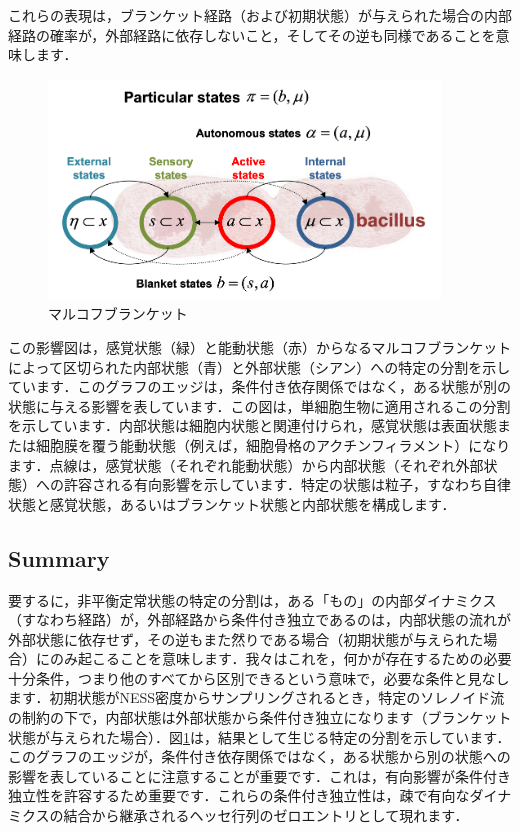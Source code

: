 \documentclass[a4paper, titlepage]{jsarticle}
\begin{document}
これらの表現は，ブランケット経路（および初期状態）が与えられた場合の内部経路の確率が，外部経路に依存しないこと，そしてその逆も同様であることを意味します．
\clearpage
\begin{figure}[htbp]
   \centering
   \includegraphics[scale=0.8]{Markov_blankets.png}
   \caption{マルコフブランケット}
   \label{markovblankets}
\end{figure}
{
    \footnotesize
    \noindent
    この影響図は，感覚状態（緑）と能動状態（赤）からなるマルコフブランケットによって区切られた内部状態（青）と外部状態（シアン）への特定の分割を示しています．このグラフのエッジは，条件付き依存関係ではなく，ある状態が別の状態に与える影響を表しています．この図は，単細胞生物に適用されるこの分割を示しています．内部状態は細胞内状態と関連付けられ，感覚状態は表面状態または細胞膜を覆う能動状態（例えば，細胞骨格のアクチンフィラメント）になります．点線は，感覚状態（それぞれ能動状態）から内部状態（それぞれ外部状態）への許容される有向影響を示しています．特定の状態は粒子，すなわち自律状態と感覚状態，あるいはブランケット状態と内部状態を構成します．
}
\subsection{Summary}
要するに，非平衡定常状態の特定の分割は，ある「もの」の内部ダイナミクス（すなわち経路）が，外部経路から条件付き独立であるのは，内部状態の流れが外部状態に依存せず，その逆もまた然りである場合（初期状態が与えられた場合）にのみ起こることを意味します．我々はこれを，何かが存在するための必要十分条件，つまり他のすべてから区別できるという意味で，必要な条件と見なします．初期状態がNESS密度からサンプリングされるとき，特定のソレノイド流の制約の下で，内部状態は外部状態から条件付き独立になります（ブランケット状態が与えられた場合）．図\ref{markovblankets}は，結果として生じる特定の分割を示しています．このグラフのエッジが，条件付き依存関係ではなく，ある状態から別の状態への影響を表していることに注意することが重要です．これは，有向影響が条件付き独立性を許容するため重要です．これらの条件付き独立性は，疎で有向なダイナミクスの結合から継承されるヘッセ行列のゼロエントリとして現れます．
\end{document}
